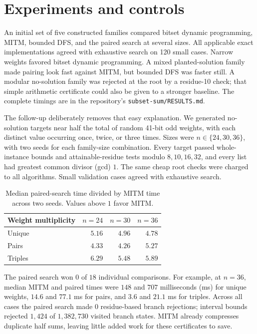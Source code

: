 \documentclass[10pt,english]{article}
\begin{document}
\section{Experiments and controls}
An initial set of five constructed families compared bitset dynamic programming, MITM, bounded DFS, and the paired search at several sizes. All applicable exact implementations agreed with exhaustive search on 120 small cases. Narrow weights favored bitset dynamic programming. A mixed planted-solution family made pairing look fast against MITM, but bounded DFS was faster still. A modular no-solution family was rejected at the root by a residue-10 check; that simple arithmetic certificate could also be given to a stronger baseline. The complete timings are in the repository's \texttt{subset-sum/RESULTS.md}.

The follow-up deliberately removes that easy explanation. We generated no-solution targets near half the total of random 41-bit odd weights, with each distinct value occurring once, twice, or three times. Sizes were \(n\in\{24,30,36\}\), with two seeds for each family-size combination. Every target passed whole-instance bounds and attainable-residue tests modulo \(8,10,16,32\), and every list had greatest common divisor (gcd) \(1\). The same cheap root checks were charged to all algorithms. Small validation cases agreed with exhaustive search.

\begin{table}[h]
\centering
\caption{Median paired-search time divided by MITM time across two seeds. Values above \(1\) favor MITM.}
\small
\begin{tabular}{lrrr}
\toprule
Weight multiplicity & \(n=24\) & \(n=30\) & \(n=36\)\\
\midrule
Unique  & \(5.16\) & \(4.96\) & \(4.78\)\\
Pairs   & \(4.33\) & \(4.26\) & \(5.27\)\\
Triples & \(6.29\) & \(5.48\) & \(5.89\)\\
\bottomrule
\end{tabular}
\end{table}

The paired search won \(0\) of \(18\) individual comparisons. For example, at \(n=36\), median MITM and paired times were \(148\) and \(707\) milliseconds (ms) for unique weights, \(14.6\) and \(77.1\) ms for pairs, and \(3.6\) and \(21.1\) ms for triples. Across all cases the paired search made \(0\) residue-based branch rejections; interval bounds rejected \(1{,}424\) of \(1{,}382{,}730\) visited branch states. MITM already compresses duplicate half sums, leaving little added work for these certificates to save.
\end{document}
